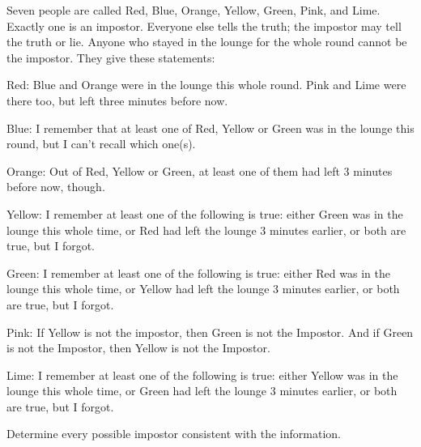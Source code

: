 Seven people are called Red, Blue, Orange, Yellow, Green, Pink, and Lime. Exactly one is an impostor. Everyone else tells the truth; the impostor may tell the truth or lie. Anyone who stayed in the lounge for the whole round cannot be the impostor. They give these statements:

Red: Blue and Orange were in the lounge this whole round. Pink and Lime were there too, but left three minutes before now.



Blue: I remember that at least one of Red, Yellow or Green was in the lounge this round, but I can't recall which one(s).



Orange: Out of Red, Yellow or Green, at least one of them had left 3 minutes before now, though.



Yellow: I remember at least one of the following is true: either Green was in the lounge this whole time, or Red had left the lounge 3 minutes earlier, or both are true, but I forgot.



Green: I remember at least one of the following is true: either Red was in the lounge this whole time, or Yellow had left the lounge 3 minutes earlier, or both are true, but I forgot.



Pink: If Yellow is not the impostor, then Green is not the Impostor. And if Green is not the Impostor, then Yellow is not the Impostor.



Lime: I remember at least one of the following is true: either Yellow was in the lounge this whole time, or Green had left the lounge 3 minutes earlier, or both are true, but I forgot.




Determine every possible impostor consistent with the information.
